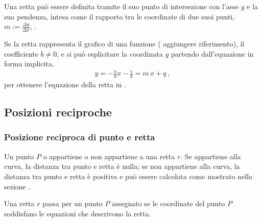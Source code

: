 \documentclass[letterpaper,10pt,italian]{jupyterBook}
\begin{document}
\sphinxAtStartPar
{} Una retta può essere definita tramite il suo punto di intersezione  con l’asse \(y\) e la sua pendenza, intesa come il rapporto tra le coordinate di due suoi punti, \(m := \frac{\Delta y}{\Delta x}\), .

\sphinxAtStartPar
Se la retta  rappresenta il grafico di una funzione ( aggiungere riferimento), il coefficiente \(b \ne 0\), e si può esplicitare la coordinata \(y\) partendo dall’equazione in forma implicita,
\begin{equation*}
\begin{split}y = -\frac{a}{b} x - \frac{c}{b} = m \, x + q \ ,\end{split}
\end{equation*}
\sphinxAtStartPar
per ottenere l’equazione della retta in .


\subsection{Posizioni reciproche}
\label{\detokenize{ch/analytic_geometry/analytic_geometry_2d/lines:posizioni-reciproche}}

\subsubsection{Posizione reciproca di punto e retta}
\label{\detokenize{ch/analytic_geometry/analytic_geometry_2d/lines:posizione-reciproca-di-punto-e-retta}}
\sphinxAtStartPar
Un punto \(P\) o appartiene o non appartiene a una retta \(r\). Se appartiene alla curva, la distanza tra punto e retta è nulla; se non appartiene alla curva, la distanza tra punto e retta è positiva e può essere calcolata come mostrato nella sezione {\hyperref[\detokenize{ch/analytic_geometry/analytic_geometry_2d/lines:geometry-analytic-2d-lines-distance-point-line}]{}}.

\sphinxAtStartPar
{} Una retta \(r\) passa per un punto \(P\) assegnato se le coordinate del punto \(P\) soddisfano le equazioni che descrivono la retta.
\end{document}

